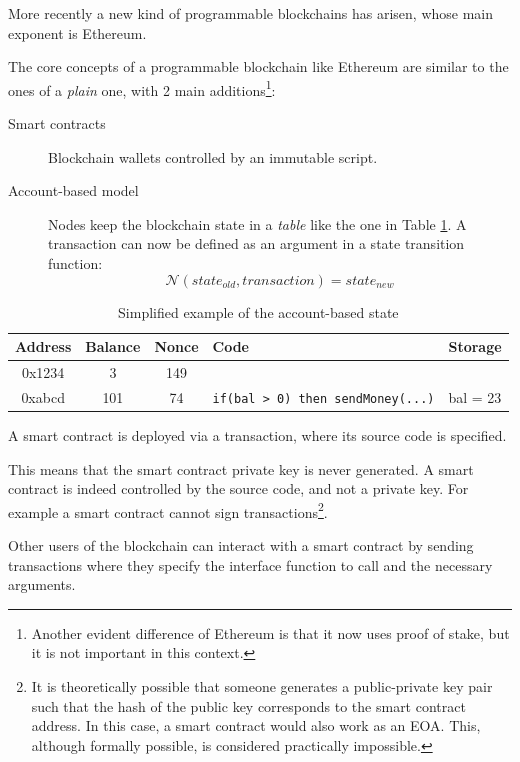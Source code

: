 \documentclass[12pt]{article}
\begin{document}
More recently a new kind of programmable blockchains has arisen, whose main exponent is Ethereum. 

The core concepts of a programmable blockchain like Ethereum are similar to the ones of a \textit{plain} one, with 2 main additions\footnote{Another evident difference of Ethereum is that it now uses proof of stake, but it is not important in this context.}:
\begin{description}
    \item[Smart contracts] Blockchain wallets controlled by an immutable script.
    \item[Account-based model] Nodes keep the blockchain state in a \textit{table} like the one in Table \ref{table:account_based_state}. A transaction can now be defined as an argument in a state transition function: 
    \[\mathcal{N} (state_{old}, transaction) = state_{new}\]
\end{description}

\begin{table}[ht]
    \centering
    \begin{tabular}{|c|c|c|l|l|}
        \hline
        \textbf{Address} & \textbf{Balance} & \textbf{Nonce} & \textbf{Code} & \textbf{Storage} \\
        \hline
        0x1234 & 3 & 149 & & \\        
        0xabcd & 101 & 74 & \verb|if(bal > 0) then sendMoney(...)| & bal = 23 \\
        \hline       
    \end{tabular}
    \caption{Simplified example of the account-based state}
    \label{table:account_based_state}
\end{table}

A smart contract is deployed via a transaction, where its source code is specified.

This means that the smart contract private key is never generated. A smart contract is indeed controlled by the source code, and not a private key. For example a smart contract cannot sign transactions\footnote{It is theoretically possible that someone generates a public-private key pair such that the hash of the public key corresponds to the smart contract address. In this case, a smart contract would also work as an EOA. This, although formally possible, is considered practically impossible.}.

Other users of the blockchain can interact with a smart contract by sending transactions where they specify the interface function to call and the necessary arguments.
\end{document}

